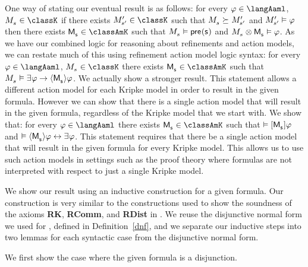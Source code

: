 One way of stating our eventual result is as follows: for every $\phi \in \langAaml$, $\kPModel{\kStateS} \in \classK$ if there exists $\kPModelP{\kStateSP} \in \classK$ such that $\kPModel{\kStateS} \simulates \kPModelP{\kStateSP}$ and ${M^{\prime}_{{s}^{\prime}}} \vDash \varphi$ then there exists $\aPModel{\aStateS} \in \classAmK$ such that $\kPModel{\kStateS} \entails \aPrecondition(\aStateS)$ and $\kPModel{\kStateS} \exec \aPModel{\aStateS} \entails \phi$. 
As we have our combined logic \logicRamlK{} for reasoning about refinements and action models, we can restate much of this using refinement action model logic syntax: for every $\phi \in \langAaml$, $\kPModel{\kStateS} \in \classK$ there exists $\aPModel{\aStateS} \in \classAmK$ such that $\kPModel{\kStateS} \entails \somerefs \phi \implies \actionE{\aPModel{\aStateS}} \phi$.
We actually show a stronger result.
This statement allows a different action model for each Kripke model in order to result in the given formula.
However we can show that there is a single action model that will result in the given formula, regardless of the Kripke model that we start with.
We show that: for every $\phi \in \langAaml$ there exists $\aPModel{\aStateS} \in \classAmK$ such that $\entails \actionA{\aPModel{\aStateS}} \phi$ and $\entails \actionE{\aPModel{\aStateS}} \phi \iff \somerefs \phi$.
This statement requires that there be a single action model that will result in the given formula for every Kripke model.
This allows us to use such action models in settings such as the proof theory where formulas are not interpreted with respect to just a single Kripke model.

We show our result using an inductive construction for a given formula.
Our construction is very similar to the constructions used to show the soundness of the axioms {\bf RK}, {\bf RComm}, and {\bf RDist} in \logicRmlK{}.
We reuse the disjunctive normal form we used for \logicRmlK{}, defined in Definition~\ref{dnf}, and we separate our inductive steps into two lemmas for each syntactic case from the disjunctive normal form.

We first show the case where the given formula is a disjunction.

